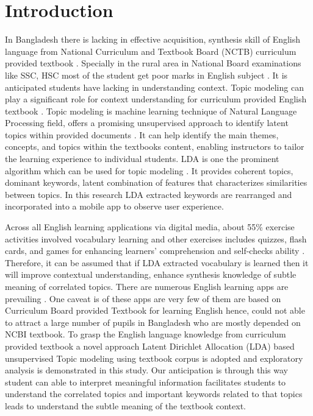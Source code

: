 \documentclass[sn-mathphys,Numbered]{sn-jnl}%
\theoremstyle{thmstyleone}%
\theoremstyle{thmstyletwo}%
\theoremstyle{thmstylethree}%
\begin{document}
\section{Introduction}\label{sec1}
In Bangladesh there is lacking in effective acquisition, synthesis skill of English language from National Curriculum and Textbook Board (NCTB) curriculum provided textbook \cite{report_schools_2018, statistics_bangladesh_2017}. Specially in the rural area in National Board examinations like SSC, HSC most of the student get poor marks in English subject \cite{noauthor_bangladesh_2021, habib_english_2018}. It is anticipated students have lacking in understanding context. Topic modeling can play a significant role for context understanding for curriculum provided English textbook \cite{qiang2020short, bethard_topic_2009, ali_transportation_2019, slater_using_2017, guerra_when_2013}. Topic modeling is machine learning technique of Natural Language Processing field, offers a promising unsupervised approach to identify latent topics within provided documents \cite{jelodar_latent_2019, gupta_pan_lda_2021, pichardo_lagunas_svd_lda_2015, selvi_classification_2019, pichardo_lagunas_svd_lda_2015_1}. It can help identify the main themes, concepts, and topics within the textbook\textquotesingle s content, enabling instructors to tailor the learning experience to individual students. LDA is one the prominent algorithm which can be used for topic modeling \cite{blei2003latent}. It provides coherent topics, dominant keywords, latent combination of features that characterizes similarities between topics. In this research LDA extracted keywords are rearranged and incorporated into a mobile app to observe user experience. 

Across all English learning applications via digital media, about 55\% exercise activities involved vocabulary learning \cite{klimova_evaluation_2018, hao_evaluative_2019, polakova_mobile_2019} and other exercises includes quizzes, flash cards, and games \cite{xu_scoping_2020, shortt_gamification_2023} for enhancing learners' comprehension and self-checks ability \cite{bernacki_mobile_2020, metruk_use_2021, isamiddinovna_mobile_2019, klimova_evaluation_2018}. Therefore, it can be assumed that if LDA extracted vocabulary is learned then it will improve contextual understanding, enhance synthesis knowledge of subtle meaning of correlated topics. There are numerous English learning apps are prevailing \cite{metruk_use_2021, rafiq_sustaining_2021, chen_evaluating_2016}. One caveat is of these apps are very few of them are based on Curriculum Board provided Textbook for learning English hence, could not able to attract a large number of pupils in Bangladesh who are mostly depended on NCBI textbook.  To grasp the English language knowledge from curriculum provided textbook a novel approach Latent Dirichlet Allocation (LDA) based unsupervised Topic modeling using textbook corpus is adopted and exploratory analysis is demonstrated in this study. Our anticipation is through this way student can able to interpret meaningful information facilitates students to understand the correlated topics and important keywords related to that topics leads to understand the subtle meaning of the textbook context.
\end{document}
